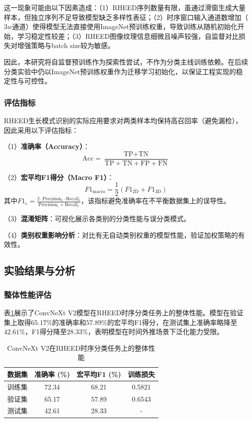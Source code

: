 这一现象可能由以下因素造成：（1）RHEED序列数量有限，虽通过滑窗生成大量样本，但独立序列不足导致模型缺乏多样性表征；（2）时序窗口输入通道数增加（$3w$通道）使得模型无法直接使用ImageNet预训练权重，导致训练从随机初始化开始，学习稳定性较差；（3）RHEED图像纹理信息细微且噪声较强，自监督对比损失对增强策略与batch size较为敏感。

因此，本研究将自监督预训练作为探索性尝试，不作为分类主线训练依赖。在后续分类实验中仍以ImageNet预训练权重作为迁移学习初始化，以保证工程实现的稳定性与可控性。

\subsubsection{评估指标}

RHEED生长模式识别的实际应用要求对两类样本均保持高召回率（避免漏检），因此采用以下评估指标：

（1）\textbf{准确率（Accuracy）}：
\begin{equation}
\text{Acc} = \frac{\text{TP} + \text{TN}}{\text{TP} + \text{TN} + \text{FP} + \text{FN}}
\end{equation}

（2）\textbf{宏平均F1得分（Macro F1）}：
\begin{equation}
F1_{\text{macro}} = \frac{1}{2}(F1_{\text{2D}} + F1_{\text{3D}})
\end{equation}
其中$F1_c = \frac{2 \cdot \text{Precision}_c \cdot \text{Recall}_c}{\text{Precision}_c + \text{Recall}_c}$，该指标避免准确率在不平衡数据集上的误导性。

（3）\textbf{混淆矩阵}：可视化展示各类别的分类性能与误分类模式。

（4）\textbf{类别权重影响分析}：对比有无自动类别权重的模型性能，验证加权策略的有效性。

\subsection{实验结果与分析}

\subsubsection{整体性能评估}

表\ref{tab:overall_results}展示了ConvNeXt V2模型在RHEED时序分类任务上的整体性能。模型在验证集上取得$65.17\%$的准确率和$57.89\%$的宏平均F1得分，在测试集上准确率略降至$42.61\%$，F1得分降至$28.33\%$，表明模型在时间外推场景下泛化能力受限。

\begin{table}[h]
\centering
\caption{ConvNeXt V2在RHEED时序分类任务上的整体性能}
\label{tab:overall_results}
\begin{tabular}{cccc}
\hline
\textbf{数据集} & \textbf{准确率 (\%)} & \textbf{宏平均F1 (\%)} & \textbf{训练损失} \\ \hline
训练集 & 72.34 & 68.21 & 0.5821 \\
验证集 & 65.17 & 57.89 & 0.6543 \\
测试集 & 42.61 & 28.33 & - \\ \hline
\end{tabular}
\end{table}


